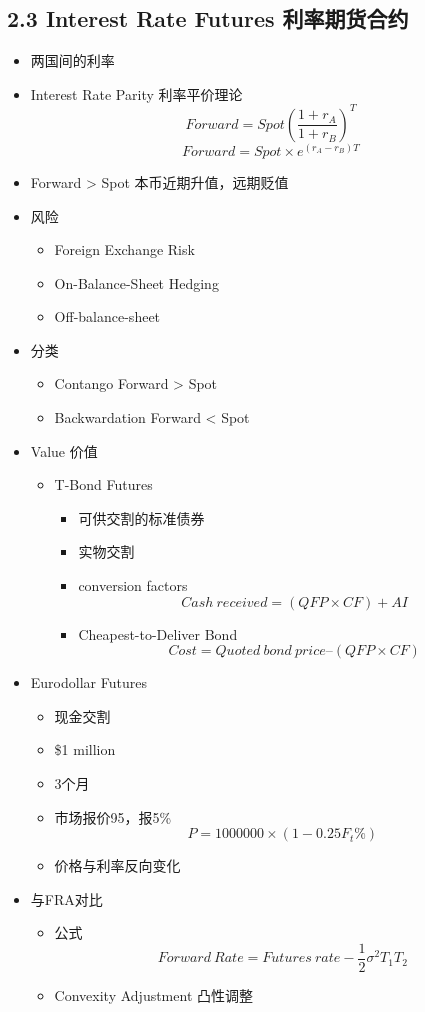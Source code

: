 \documentclass[a4paper,6pt,twoside,openany]{article}
\begin{document}
\subsection*{2.3 Interest Rate Futures 利率期货合约}
\begin{itemize}
\item 两国间的利率
\item Interest Rate Parity 利率平价理论
  $$Forward = Spot(\frac{1 + r_A}{1 + r_B})^T$$
  $$Forward = Spot \times e^{(r_A - r_B)T}$$
\item Forward > Spot 本币近期升值，远期贬值
\item 风险
  \begin{itemize}
  \item Foreign Exchange Risk
  \item On-Balance-Sheet Hedging
  \item Off-balance-sheet

  \end{itemize}
\item 分类
  \begin{itemize}
  \item Contango Forward > Spot
  \item Backwardation Forward < Spot
  \end{itemize}
\item Value 价值
  \begin{itemize}
  \item T-Bond Futures
    \begin{itemize}
    \item 可供交割的标准债券
    \item 实物交割
    \item conversion factors
      $$Cash\ received = (QFP \times CF) + AI$$
    \item Cheapest-to-Deliver Bond
      $$Cost = Quoted\ bond\ price – (QFP \times CF)$$
    \end{itemize}
  \end{itemize}
\item Eurodollar Futures
  \begin{itemize}
  \item 现金交割
  \item \$1 million
  \item 3个月
  \item 市场报价95，报5\%
    $$P = 1000000 \times (1 - 0.25 F_t\%)$$
  \item 价格与利率反向变化
  \end{itemize}
\item 与FRA对比
  \begin{itemize}
  \item 公式 $$Forward\ Rate = Futures\ rate - \frac{1}{2}\sigma^2T_1T_2$$
  \item Convexity Adjustment 凸性调整
  \end{itemize}
\end{itemize}
    
\end{document}
